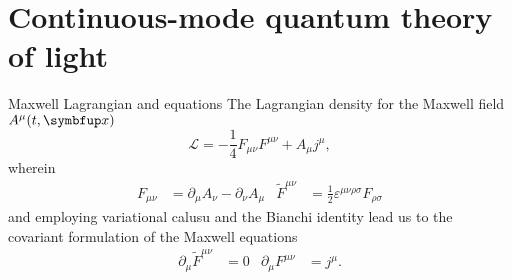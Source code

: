 \documentclass[aspectratio=169,usenames,dvipsnames]{beamer}
\begin{document}
	\section{Continuous-mode quantum theory of light}
	
	\begin{frame}{Maxwell Lagrangian and equations}
		The Lagrangian density for the Maxwell field $A^\mu(t,\vb{x})$
		\begin{equation}
			\mathcal{L}
			=
			-
			\frac{1}{4}
			F_{\mu\nu}
			F^{\mu\nu}
			+
			A_\mu j^\mu
			,
		\end{equation}
		wherein
		\begin{align}
			F_{\mu\nu}
			&=
			\partial_\mu
			A_\nu
			-
			\partial_\nu
			A_\mu
			&
			\tilde{F}^{\mu\nu}
			&=
			\frac{1}{2}
			\varepsilon^{\mu\nu\rho\sigma}
			F_{\rho\sigma}
		\end{align}
		and employing variational calusu and the Bianchi identity lead us to the covariant formulation of the Maxwell equations
		\begin{align}
			\partial_\mu
			\tilde{F}^{\mu\nu}
			&=
			0
			&
			\partial_\mu
			F^{\mu\nu}
			&=
			j^\mu
			.
		\end{align}
	\end{frame}
\end{document}
